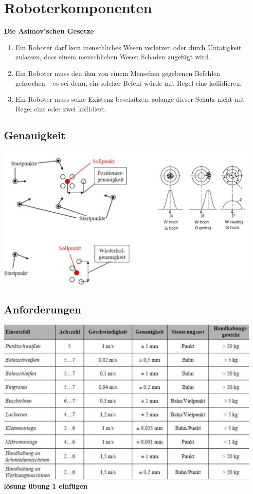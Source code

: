 \section{Roboterkomponenten}
\textbf{Die Asimov’schen Gesetze}\newline
\begin{enumerate}
    \item Ein Roboter darf kein menschliches Wesen verletzen oder durch Untätigkeit zulassen, dass einem menschlichen Wesen Schaden zugefügt wird.
    \item Ein Roboter muss den ihm von einem Menschen gegebenen Befehlen gehorchen – es sei denn, ein solcher Befehl würde mit Regel eins kollidieren.
    \item Ein Roboter muss seine Existenz beschützen, solange dieser Schutz nicht mit Regel eins oder zwei kollidiert.
\end{enumerate}
\begin{minipage}{0.5\linewidth}
\subsection{Genauigkeit}
\includegraphics[width=\linewidth]{./bilder/genauigkeit.png}
\end{minipage}
\begin{minipage}{0.5\linewidth}
\subsection{Anforderungen}
\includegraphics[width=\linewidth]{./bilder/anforderung.png}
\textbf{lösung übung 1 einfügen}
\end{minipage}

